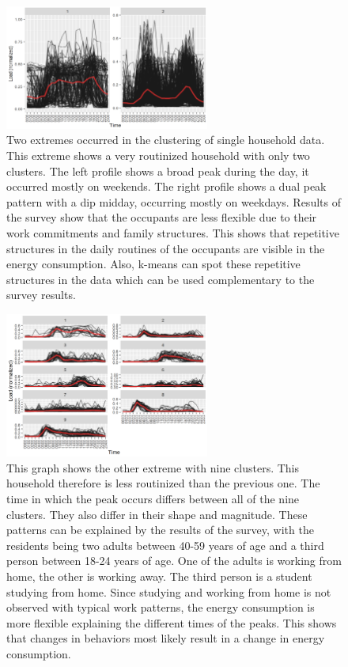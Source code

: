 \begin{figure}
    \centering
    \includegraphics[width=0.6\textwidth]{figures/malatesta_hsop/malatesta_routinisedHousehold.jpg}
    \caption{Two extremes occurred in the clustering of single household data.
    This extreme shows a very routinized household with only two clusters.
    The left profile shows a broad peak during the day, it occurred mostly on weekends.
    The right profile shows a dual peak pattern with a dip midday, occurring mostly on weekdays.
    Results of the survey show that the occupants are less flexible due to their work commitments and family structures.
    This shows that repetitive structures in the daily routines of the occupants are visible in the energy consumption.
    Also, k-means can spot these repetitive structures in the data which can be used complementary to the survey results.
    }
    \label{fig:routinized_household}
\end{figure}

\begin{figure}
    \centering
    \includegraphics[width=0.6\textwidth]{figures/malatesta_hsop/malatesta_unroutinisedHousehold.jpg}
    \caption{This graph shows the other extreme with nine clusters.
    This household therefore is less routinized than the previous one.
    The time in which the peak occurs differs between all of the nine clusters.
    They also differ in their shape and magnitude.
    These patterns can be explained by the results of the survey, with the residents being two adults between 40-59 years of age and a third person between 18-24 years of age.
    One of the adults is working from home, the other is working away.
    The third person is a student studying from home.
    Since studying and working from home is not observed with typical work patterns, the energy consumption is more flexible explaining the different times of the peaks.
    This shows that changes in behaviors most likely result in a change in energy consumption.
    }
    \label{fig:non_routinized_household}
\end{figure}




